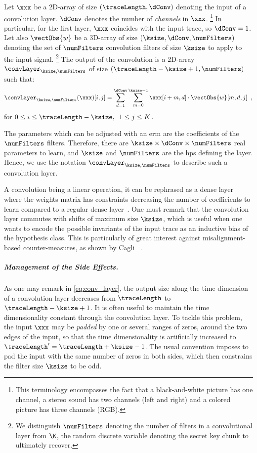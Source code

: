 Let \(\xxx\) be a 2D-array of size \((\traceLength, \dConv)\) denoting the input of a convolution layer.
\(\dConv\) denotes the number of \emph{channels} in \(\xxx\).%
\footnote{
	This terminology encompasses the fact that a black-and-white picture has one channel, a stereo sound has two channels (left and right) and a colored picture has three channels (RGB).
}
In particular, for the first layer, \(\xxx\) coincides with the input trace, so \(\dConv=1\).
Let also \(\vectObs{w}\) be a 3D-array of size \((\ksize, \dConv, \numFilters)\) denoting the set of \(\numFilters\) convolution filters of size \(\ksize\) to apply to the input signal.%
\footnote{
	We distinguish \(\numFilters\) denoting the number of filters in a convolutional layer from \(\K\), the random discrete variable denoting the secret key chunk to ultimately recover.
}
The output of the convolution is a 2D-array \(\convLayer_{\ksize, \numFilters}\) of size \((\traceLength - \ksize + 1, \numFilters)\) such that:
\begin{equation}
	\convLayer_{\ksize, \numFilters}(\xxx)[i,j] = 
	\sum_{d=1}^{\dConv}
		\sum_{m=0}^{\ksize-1}
			\xxx[i+m,d] \cdot \vectObs{w}[m,d,j]
	\enspace ,
	\label{eq:conv_layer}
\end{equation}
for \(0 \leq i \leq \traceLength - \ksize, \enspace 1 \leq j \leq K\).

The parameters which can be adjusted with an \gls{erm} are the coefficients of the \(\numFilters\) filters.
Therefore, there are \(\ksize \times \dConv \times \numFilters\) real parameters to learn, and \(\ksize\) and \(\numFilters\) are the \glspl{hp} defining the layer.
Hence, we use the notation \(\convLayer_{\ksize, \numFilters}\) to describe such a convolution layer.


A convolution being a linear operation, it can be rephrased as a dense layer where the weights matrix has constraints decreasing the number of coefficients to learn compared to a regular dense layer~\cite[Sec.~9.1]{goodfellow_deep_2017}.
One must remark that the convolution layer commutes with shifts of maximum size \(\ksize\), which is useful when one wants to encode the possible invariants of the input trace as an inductive bias of the hypothesis class.
This is particularly of great interest against misalignment-based counter-measures, as shown by Cagli \etal{}~\cite{cagli_convolutional_2017}.


\subparagraph{Management of the Side Effects.}
As one may remark in \autoref{eq:conv_layer}, the output size along the time dimension of a convolution layer decreases from \(\traceLength\) to \(\traceLength - \ksize + 1\).
It is often useful to maintain the time dimensionality constant through the convolution layer.
To tackle this problem, the input \(\xxx\) may be \emph{padded} by one or several ranges of zeros, around the two edges of the input, so that the time dimensionality is artificially increased to \(\traceLength' = \traceLength + \ksize-1\).
The usual convention imposes to pad the input with the same number of zeros in both sides, which then constrains the filter size \(\ksize\) to be odd.

